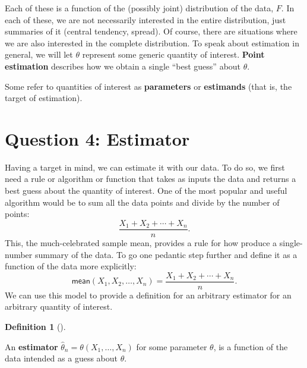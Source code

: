 \documentclass[
  13pt,
  letterpaper,
  DIV=11,
  numbers=noendperiod]{scrreprt}
\theoremstyle{plain}
\theoremstyle{definition}
\theoremstyle{definition}
\newtheorem{definition}{Definition}[chapter]
\theoremstyle{remark}
\begin{document}
Each of these is a function of the (possibly joint) distribution of the
data, \(F\). In each of these, we are not necessarily interested in the
entire distribution, just summaries of it (central tendency, spread). Of
course, there are situations where we are also interested in the
complete distribution. To speak about estimation in general, we will let
\(\theta\) represent some generic quantity of interest. \textbf{Point
estimation} describes how we obtain a single ``best guess'' about
\(\theta\).

\begin{tcolorbox}[enhanced jigsaw, title=\textcolor{quarto-callout-note-color}{\faInfo}\hspace{0.5em}{Note}, breakable, colbacktitle=quarto-callout-note-color!10!white, toptitle=1mm, colback=white, arc=.35mm, left=2mm, opacityback=0, titlerule=0mm, colframe=quarto-callout-note-color-frame, leftrule=.75mm, coltitle=black, opacitybacktitle=0.6, bottomtitle=1mm, rightrule=.15mm, bottomrule=.15mm, toprule=.15mm]

Some refer to quantities of interest as \textbf{parameters} or
\textbf{estimands} (that is, the target of estimation).

\end{tcolorbox}

\section{Question 4: Estimator}\label{question-4-estimator-1}

Having a target in mind, we can estimate it with our data. To do so, we
first need a rule or algorithm or function that takes as inputs the data
and returns a best guess about the quantity of interest. One of the most
popular and useful algorithm would be to sum all the data points and
divide by the number of points: \[
\frac{X_1 + X_2 + \cdots + X_n}{n}.
\] This, the much-celebrated sample mean, provides a rule for how
produce a single-number summary of the data. To go one pedantic step
further and define it as a function of the data more explicitly: \[
\textsf{mean}(X_1, X_2, \ldots, X_n) = \frac{X_1 + X_2 + \cdots + X_n}{n}.
\] We can use this model to provide a definition for an arbitrary
estimator for an arbitrary quantity of interest.

\begin{definition}[]\protect\hypertarget{def-estimator}{}\label{def-estimator}

An \textbf{estimator} \(\widehat{\theta}_n = \theta(X_1, \ldots, X_n)\)
for some parameter \(\theta\), is a function of the data intended as a
guess about \(\theta\).

\end{definition}
\end{document}
